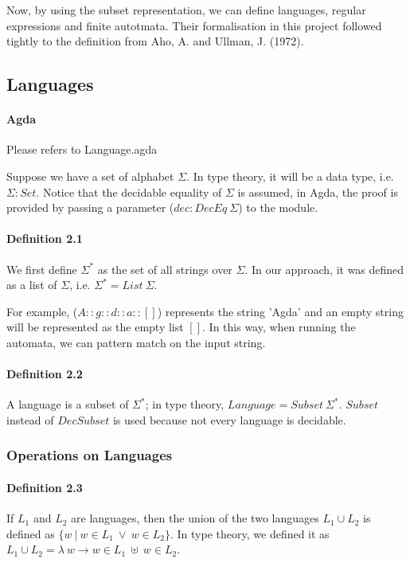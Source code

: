 \documentclass[twoside,openright,final]{bhamthesis}
\begin{document}
\par Now, by using the subset representation, we can define languages, regular expressions and finite
autotmata. Their formalisation in this project followed tightly to the
definition from Aho, A. and Ullman, J. (1972). 

\subsection{Languages}
\paragraph{Agda} Please refers to Language.agda \\

\par Suppose we have a set of alphabet \(\Sigma\). In type theory, it will be a data type,
i.e. \(\Sigma : Set\). Notice that the decidable equality of
\(\Sigma\) is assumed, in Agda, the proof is provided by passing a
parameter (\(dec : DecEq\ \Sigma\)) to the module.

\paragraph{Definition 2.1} We first define \(\Sigma^*\) as the set of all
strings over \(\Sigma\). In our approach, it was defined as a list of
\(\Sigma\), i.e. \(\Sigma^* = List\ \Sigma\). \\

\par For example, (\(A :: g ::
d :: a :: []\)) represents the string 'Agda' and an empty string will
be represented as the empty list \([]\). In this way, when running the
automata, we can pattern match on the input string. 

\paragraph{Definition 2.2} A language is a subset of
\(\Sigma^*\); in type theory, \(Language = Subset\ \Sigma^*\). 
\(Subset\) instead of \(DecSubset\) is used because not every language is decidable. 

\subsubsection{Operations on Languages}

\paragraph{Definition 2.3} If \(L_1\) and \(L_2\) are languages, then
the union of the two languages \(L_1\cup L_2\) is defined as \(\{w\
|\  w \in L_1\ \vee \ w \in
L_2\}\). In type theory, we defined it as \(L_1 \cup L_2 = \lambda\ w \to w \in L_1\ \uplus\ w
\in L_2\).
\end{document}
